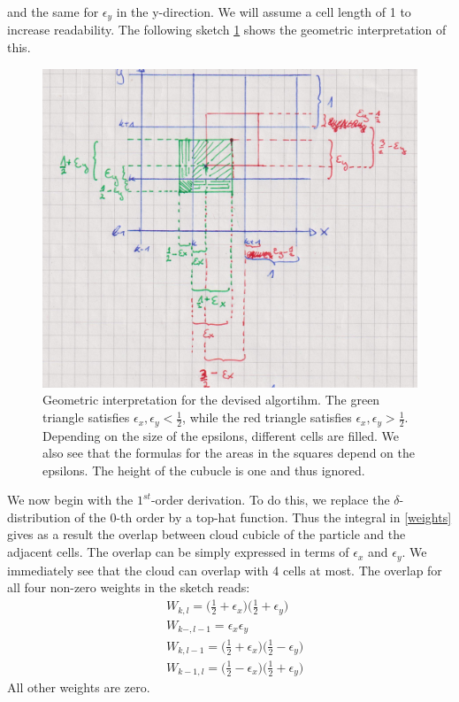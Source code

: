 \documentclass{scrartcl}
\begin{document}
and the same for \( \epsilon_y \) in the y-direction. 
We will assume a cell length of 1 to increase readability. The following sketch \ref{fig:sketch01} shows the geometric interpretation of this.
\begin{figure}[h]
	\centering
	\includegraphics[width=0.7\linewidth]{Plots/sketch01}
	\caption{Geometric interpretation for the devised algortihm. The green triangle satisfies \( \epsilon_x, \epsilon_y < \frac{1}{2} \), while the red triangle satisfies \( \epsilon_x, \epsilon_y > \frac{1}{2} \). Depending on the size of the epsilons, different cells are filled. We also see that the formulas for the areas in the squares depend on the epsilons. The height of the cubucle is one and thus ignored.}
	\label{fig:sketch01}
\end{figure}
We now begin with the \( 1^{st} \)-order derivation. To do this, we replace the \(\delta\)-distribution of the 0-th order by a top-hat function. Thus the integral in \eqref{weights} gives as a result the overlap between cloud cubicle of the particle and the adjacent cells. 
The overlap can be simply expressed in terms of \( \epsilon_x \) and \( \epsilon_y \). We immediately see that the cloud can overlap with 4 cells at most. The overlap for all four non-zero weights in the sketch reads:
\begin{align*}
	&W_{k,l} = \Big(\frac{1}{2} + \epsilon_x\Big) \Big(\frac{1}{2} + \epsilon_y\Big)\\
	&W_{k-,l-1} = \epsilon_x \epsilon_y\\
	&W_{k,l-1} = \Big(\frac{1}{2} + \epsilon_x\Big) \Big(\frac{1}{2} - \epsilon_y\Big)\\
	&W_{k-1,l} = \Big(\frac{1}{2}-\epsilon_x\Big) \Big(\frac{1}{2} + \epsilon_y\Big)
\end{align*}
All other weights are zero.
\end{document}
